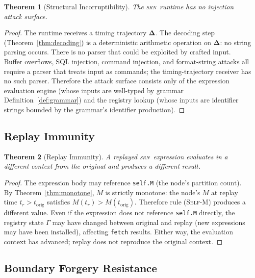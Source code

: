 \documentclass[twocolumn,11pt,a4paper]{article}
\newtheorem{theorem}{Theorem}[section]
\theoremstyle{definition}
\theoremstyle{remark}
\newcommand{\srn}{\textsc{srn}}
\newcommand{\Reg}{\Gamma}
\begin{document}
\begin{theorem}[Structural Incorruptibility]
\label{thm:security1}
The \srn\ runtime has no injection attack surface.
\end{theorem}
\begin{proof}
The runtime receives a timing trajectory $\boldsymbol{\Delta}$.  The
decoding step (Theorem~\ref{thm:decoding}) is a deterministic arithmetic
operation on $\boldsymbol{\Delta}$: no string parsing occurs.  There is
no parser that could be exploited by crafted input.  Buffer overflows,
SQL injection, command injection, and format-string attacks all require
a parser that treats input as commands; the timing-trajectory receiver
has no such parser.  Therefore the attack surface consists only of
the expression evaluation engine (whose inputs are well-typed by
grammar Definition~\ref{def:grammar}) and the registry lookup (whose
inputs are identifier strings bounded by the grammar's identifier
production).
\end{proof}

\subsection{Replay Immunity}

\begin{theorem}[Replay Immunity]
\label{thm:replay}
A replayed \srn\ expression evaluates in a different context from the
original and produces a different result.
\end{theorem}
\begin{proof}
The expression body may reference \texttt{self.M} (the node's partition
count).  By Theorem~\ref{thm:monotone}, $M$ is strictly monotone: the
node's $M$ at replay time $t_r > t_{\mathrm{orig}}$ satisfies
$M(t_r) > M(t_{\mathrm{orig}})$.  Therefore rule \textsc{(Self-M)}
produces a different value.  Even if the expression does not reference
\texttt{self.M} directly, the registry state $\Reg$ may have changed
between original and replay (new expressions may have been installed),
affecting \texttt{fetch} results.  Either way, the evaluation context
has advanced; replay does not reproduce the original context.
\end{proof}

\subsection{Boundary Forgery Resistance}
\end{document}
